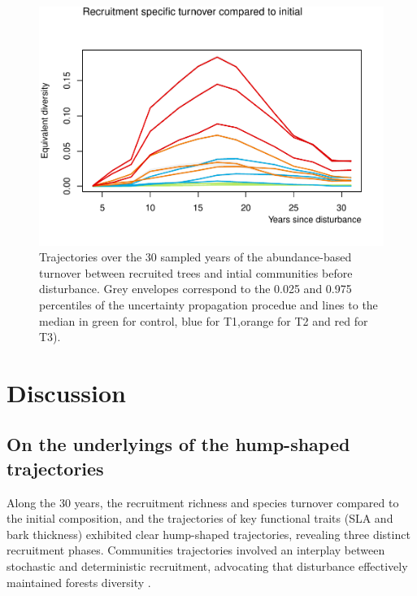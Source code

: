 \documentclass[fleqn,10pt]{ArtEcoFoG} %
\begin{document}
\begin{figure}

{\centering \includegraphics{RecruitmentTrajectories_files/figure-latex/Turnover-1} 

}

\caption{Trajectories over the 30 sampled years of the abundance-based turnover between recruited trees and intial communities before disturbance. Grey envelopes correspond to the 0.025 and 0.975 percentiles of the uncertainty propagation procedue and lines to the median in green for control, blue for T1,orange for T2 and red for T3).}\label{fig:Turnover}
\end{figure}

\section{Discussion}\label{discussion}

\subsection{On the underlyings of the hump-shaped
trajectories}\label{on-the-underlyings-of-the-hump-shaped-trajectories}

Along the 30 years, the recruitment richness and species turnover
compared to the initial composition, and the trajectories of key
functional traits (SLA and bark thickness) exhibited clear hump-shaped
trajectories, revealing three distinct recruitment phases. Communities
trajectories involved an interplay between stochastic and deterministic
recruitment, advocating that disturbance effectively maintained forests
diversity \citep{Molino2001, Sheil2003}.
\end{document}
